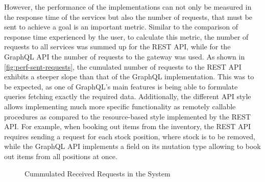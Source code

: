 However, the performance of the implementations can not only be measured in the response time of the services but also the number of requests, that must be sent to achieve a goal is an important metric.
Similar to the comparison of response time experienced by the user, to calculate this metric, the number of requests to all services was summed up for the \ac{REST} \ac{API}, while for the GraphQL \ac{API} the number of requests to the gateway was used.
As shown in \autoref{fig:perf-sent-requests}, the cumulated number of requests to the \ac{REST} \ac{API} exhibits a steeper slope than that of the GraphQL implementation.
This was to be expected, as one of GraphQL's main features is being able to formulate queries fetching exactly the required data.
Additionally, the different \ac{API} style allows implementing much more specific functionality as remotely callable procedures as compared to the resource-based style implemented by the \ac{REST} \ac{API}.
For example, when booking out items from the inventory, the \ac{REST} \ac{API} requires sending a request for each stock position, where stock is to be removed, while the GraphQL \ac{API} implements a field on its mutation type allowing to book out items from all positions at once.

\begin{figure}[t!]
    \centering
    \caption{Cummulated Received Requests in the System}\label{fig:perf-sent-requests}    
\end{figure}



